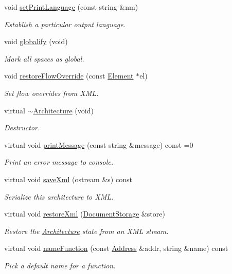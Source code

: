 \begin{DoxyCompactItemize}
void \mbox{\hyperlink{class_architecture_ae002322a1fd364665099cbe3f98b63a6}{set\+Print\+Language}} (const string \&nm)
\begin{DoxyCompactList}\small\item\em Establish a particular output language. \end{DoxyCompactList}\item 
void \mbox{\hyperlink{class_architecture_a726878f225eebebb51d4e618f4d53631}{globalify}} (void)
\begin{DoxyCompactList}\small\item\em Mark {\itshape all} spaces as global. \end{DoxyCompactList}\item 
void \mbox{\hyperlink{class_architecture_a4181297a704049ca50c3fc3d233bc0e4}{restore\+Flow\+Override}} (const \mbox{\hyperlink{class_element}{Element}} $\ast$el)
\begin{DoxyCompactList}\small\item\em Set flow overrides from X\+ML. \end{DoxyCompactList}\item 
virtual \mbox{\hyperlink{class_architecture_aaef3c8d834e7f5c22db0cf15eefc7e45}{$\sim$\+Architecture}} (void)
\begin{DoxyCompactList}\small\item\em Destructor. \end{DoxyCompactList}\item 
virtual void \mbox{\hyperlink{class_architecture_a69348906c7601efa002f1f1365decda9}{print\+Message}} (const string \&message) const =0
\begin{DoxyCompactList}\small\item\em Print an error message to console. \end{DoxyCompactList}\item 
virtual void \mbox{\hyperlink{class_architecture_af760a127622d4cdd4b6b436122478cb5}{save\+Xml}} (ostream \&s) const
\begin{DoxyCompactList}\small\item\em Serialize this architecture to X\+ML. \end{DoxyCompactList}\item 
virtual void \mbox{\hyperlink{class_architecture_ab15a398b9f84dd62ad36d1e83895783a}{restore\+Xml}} (\mbox{\hyperlink{class_document_storage}{Document\+Storage}} \&store)
\begin{DoxyCompactList}\small\item\em Restore the \mbox{\hyperlink{class_architecture}{Architecture}} state from an X\+ML stream. \end{DoxyCompactList}\item 
virtual void \mbox{\hyperlink{class_architecture_a7bd655cd2adbd6538883e1771276604e}{name\+Function}} (const \mbox{\hyperlink{class_address}{Address}} \&addr, string \&name) const
\begin{DoxyCompactList}\small\item\em Pick a default name for a function. \end{DoxyCompactList}\end{DoxyCompactItemize}
